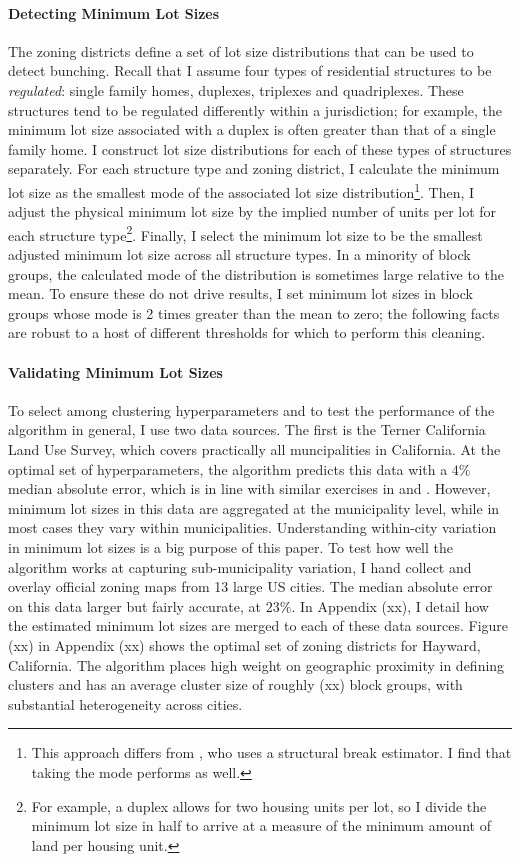\documentclass[11pt]{article}
\begin{document}
	 \paragraph*{Detecting Minimum Lot Sizes} The zoning districts define a set of lot size distributions that can be used to detect bunching. Recall that I assume four types of residential structures to be \textit{regulated}: single family homes, duplexes, triplexes and quadriplexes. These structures tend to be regulated differently within a jurisdiction; for example, the minimum lot size associated with a duplex is often greater than that of a single family home. I construct lot size distributions for each of these types of structures separately. For each structure type and zoning district, I calculate the minimum lot size as the smallest mode of the associated lot size distribution\footnote{This approach differs from \cite{Song}, who uses a structural break estimator. I find that taking the mode performs as well.}. Then, I adjust the physical minimum lot size by the implied number of units per lot for each structure type\footnote{For example, a duplex allows for two housing units per lot, so I divide the minimum lot size in half to arrive at a measure of the minimum amount of land per housing unit.}. Finally,  I select the minimum lot size to be the smallest adjusted minimum lot size across all structure types. In a minority of block groups, the calculated mode of the distribution is sometimes large relative to the mean. To ensure these do not drive results, I set minimum lot sizes in block groups whose mode is 2 times greater than the mean to zero; the following facts are robust to a host of different thresholds for which to perform this cleaning.
	 
	 \paragraph{Validating Minimum Lot Sizes} To select among clustering hyperparameters and to test the performance of the algorithm in general, I use two data sources. The first is the Terner California Land Use Survey, which covers practically all muncipalities in California. At the optimal set of hyperparameters, the algorithm predicts this data with a $4 \%$ median absolute error, which is in line with similar exercises in \cite{Song} and \cite{Cui}. However, minimum lot sizes in this data are aggregated at the municipality level, while in most cases they vary within municipalities. Understanding within-city variation in minimum lot sizes is a big purpose of this paper. To test how well the algorithm works at capturing sub-municipality variation, I hand collect and overlay official zoning maps from 13 large US cities. The median absolute error on this data larger but fairly accurate, at $23 \%$. In Appendix (xx), I detail how the estimated minimum lot sizes are merged to each of these data sources. Figure (xx) in Appendix (xx) shows the optimal set of zoning districts for Hayward, California. The algorithm places high weight on geographic proximity in defining clusters and has an average cluster size of roughly (xx) block groups, with substantial heterogeneity across cities. 
	 
\end{document}
